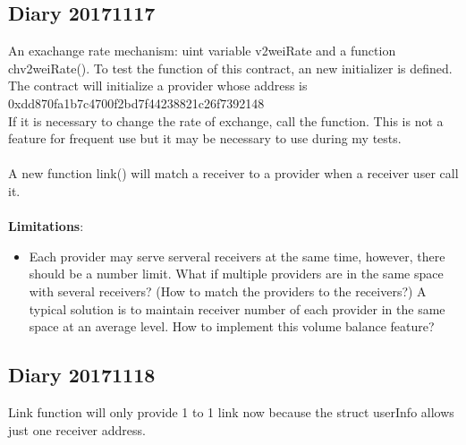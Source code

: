 \subsection{Diary 20171117}
An exachange rate mechanism: uint variable v2weiRate and a function chv2weiRate().
To test the function of this contract, an new initializer is defined.
The contract will initialize a provider whose address is\\
0xdd870fa1b7c4700f2bd7f44238821c26f7392148\\

If it is necessary to change the rate of exchange, call the function. This is not 
a feature for frequent use but it may be necessary to use during my tests.\\\\
A new function link() will match a receiver to a provider when a receiver user call it.\\\\
\textbf{Limitations}:
\begin{itemize}
    \item Each provider may serve serveral receivers at the same time, however,
    there should be a number limit. What if multiple providers are in the same space with
    several receivers? (How to match the providers to the receivers?)
    A typical solution is to maintain receiver number of each provider in the same space
    at an average level. How to implement this volume balance feature?
\end{itemize}
\subsection{Diary 20171118}
Link function will only provide 1 to 1 link now because the struct userInfo allows just one receiver address.

%


